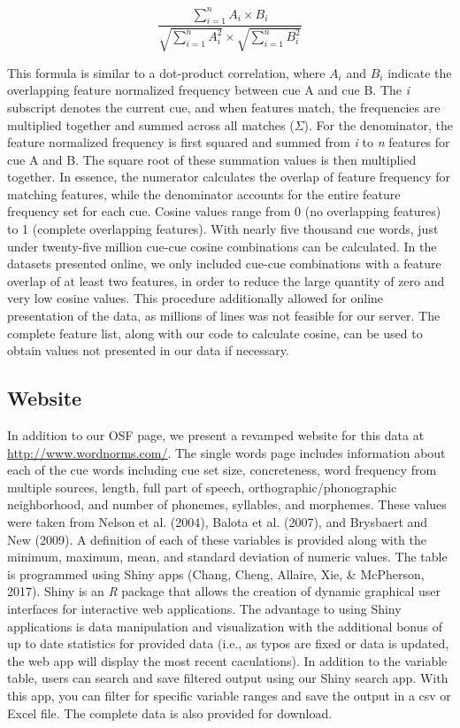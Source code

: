 \documentclass[english,man]{apa6}
\theoremstyle{definition}
\theoremstyle{definition}
\theoremstyle{definition}
\theoremstyle{remark}
\begin{document}
\[
\frac{\sum_{i=1}^{n} A_i \times B_i} {\sqrt{\sum_{i=1}^{n} A_i^2} \times \sqrt{\sum_{i=1}^{n} B_i^2}}
\]

This formula is similar to a dot-product correlation, where \(A_i\) and
\(B_i\) indicate the overlapping feature normalized frequency between
cue A and cue B. The \emph{i} subscript denotes the current cue, and
when features match, the frequencies are multiplied together and summed
across all matches (\(\Sigma\)). For the denominator, the feature
normalized frequency is first squared and summed from \emph{i} to
\emph{n} features for cue A and B. The square root of these summation
values is then multiplied together. In essence, the numerator calculates
the overlap of feature frequency for matching features, while the
denominator accounts for the entire feature frequency set for each cue.
Cosine values range from 0 (no overlapping features) to 1 (complete
overlapping features). With nearly five thousand cue words, just under
twenty-five million cue-cue cosine combinations can be calculated. In
the datasets presented online, we only included cue-cue combinations
with a feature overlap of at least two features, in order to reduce the
large quantity of zero and very low cosine values. This procedure
additionally allowed for online presentation of the data, as millions of
lines was not feasible for our server. The complete feature list, along
with our code to calculate cosine, can be used to obtain values not
presented in our data if necessary.

\subsection{Website}\label{website}

In addition to our OSF page, we present a revamped website for this data
at \url{http://www.wordnorms.com/}. The single words page includes
information about each of the cue words including cue set size,
concreteness, word frequency from multiple sources, length, full part of
speech, orthographic/phonographic neighborhood, and number of phonemes,
syllables, and morphemes. These values were taken from Nelson et al.
(2004), Balota et al. (2007), and Brysbaert and New (2009). A definition
of each of these variables is provided along with the minimum, maximum,
mean, and standard deviation of numeric values. The table is programmed
using Shiny apps (Chang, Cheng, Allaire, Xie, \& McPherson, 2017). Shiny
is an \emph{R} package that allows the creation of dynamic graphical
user interfaces for interactive web applications. The advantage to using
Shiny applications is data manipulation and visualization with the
additional bonus of up to date statistics for provided data (i.e., as
typos are fixed or data is updated, the web app will display the most
recent caculations). In addition to the variable table, users can search
and save filtered output using our Shiny search app. With this app, you
can filter for specific variable ranges and save the output in a csv or
Excel file. The complete data is also provided for download.
\end{document}
